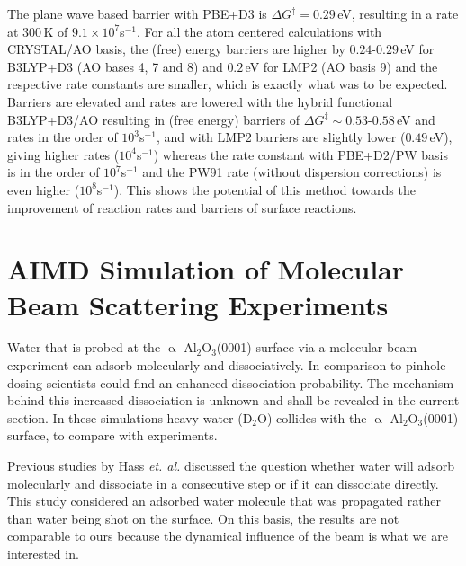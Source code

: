 \documentclass[11pt,DIV=13,BCOR=5mm,a4paper,headinclude]{scrbook}
\begin{document}
The plane wave based barrier with PBE+D3 is $\Delta G^\ddagger=0.29\,$eV, resulting in a rate at $300\,$K of $9.1\times 10^7$s$^{-1}$.
For all the atom centered calculations with CRYSTAL/AO basis, the (free) energy barriers are higher by $0.24$-$0.29\,$eV for B3LYP+D3 (AO bases 4, 7 and 8) and $0.2\,$eV for LMP2 (AO basis 9) and the respective rate constants are smaller, which is exactly what was to be expected.
Barriers are elevated and rates are lowered with the hybrid functional B3LYP+D3/AO resulting in (free energy) barriers of $\Delta G^\ddagger\sim0.53$-$0.58\,$eV and rates in the order of $10^3$s$^{-1}$, and with LMP2 barriers are slightly lower ($0.49\,$eV), giving higher rates ($10^4$s$^{-1}$) whereas the rate constant with PBE+D2/PW basis is in the order of $10^7$s$^{-1}$ and the PW91 rate (without dispersion corrections) is even higher ($10^8$s$^{-1}$). 
This shows the potential of this method towards the improvement of reaction rates and barriers of surface reactions.

  
\section[AIMD Simulation of Molecular Beam Scattering Experiments]{AIMD Simulation of Molecular Beam Scattering Experiments\cite{Heiden0001_2018}}\label{sec_0001AIMD}
Water that is probed at the $\upalpha$-Al$_2$O$_3$(0001) surface via a molecular beam experiment can adsorb molecularly and dissociatively.
In comparison to pinhole dosing scientists could find an enhanced dissociation probability\cite{Heiden0001_2018}.
The mechanism behind this increased dissociation is unknown and shall be revealed in the current section.
In these simulations heavy water (D$_2$O) collides with the $\upalpha$-Al$_{\text{2}}$O$_{\text{3}}$(0001) surface, to compare with experiments.


Previous studies by Hass \textit{et. al.}\cite{hass98,hass00} discussed the question whether water will adsorb molecularly and dissociate in a consecutive step or if it can dissociate directly.
This study considered an adsorbed water molecule that was propagated rather than water being shot on the surface.
On this basis, the results are not comparable to ours because the dynamical influence of the beam is what we are interested in.
\end{document}
